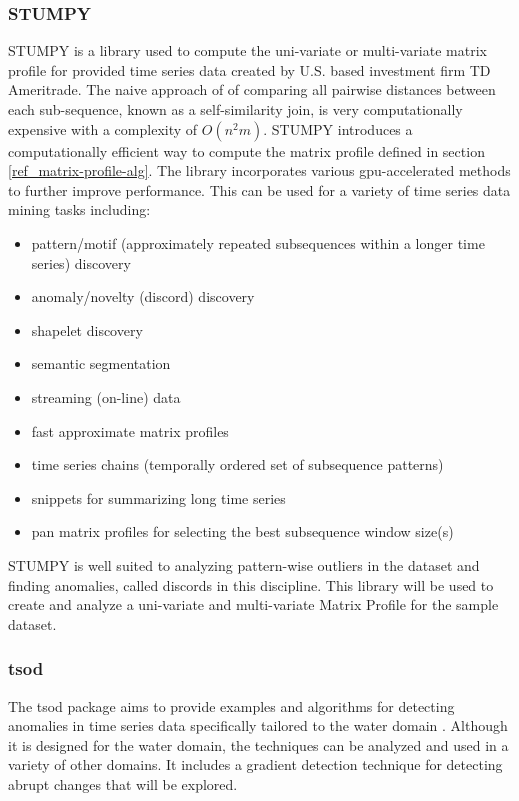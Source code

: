 \subsubsection{STUMPY}
STUMPY is a library used to compute the uni-variate or multi-variate matrix profile for provided time series data created by U.S. based investment firm TD Ameritrade. The naive approach of of comparing all pairwise distances between each sub-sequence, known as a self-similarity join, is very computationally expensive with a complexity of $O(n^2m)$. STUMPY introduces a computationally efficient way to compute the matrix profile defined in section \ref{ref_matrix-profile-alg}. The library incorporates various gpu-accelerated methods to further improve performance. This can be used for a variety of time series data mining tasks including: \cite{law2019stumpy}
\begin{itemize}[leftmargin=1cm]
    \item pattern/motif (approximately repeated subsequences within a longer time series) discovery
    \item anomaly/novelty (discord) discovery
    \item shapelet discovery
    \item semantic segmentation
    \item streaming (on-line) data
    \item fast approximate matrix profiles
    \item time series chains (temporally ordered set of subsequence patterns)
    \item snippets for summarizing long time series
    \item pan matrix profiles for selecting the best subsequence window size(s)
\end{itemize}
STUMPY is well suited to analyzing pattern-wise outliers in the dataset and finding anomalies, called discords in this discipline. This library will be used to create and analyze a uni-variate and multi-variate Matrix Profile for the sample dataset. 

\subsubsection{tsod}

The tsod package aims to provide examples and algorithms for detecting anomalies in time series data specifically tailored to the water domain \cite{tsod}. Although it is designed for the water domain, the techniques can be analyzed and used in a variety of other domains. It includes a gradient detection technique for detecting abrupt changes that will be explored.

